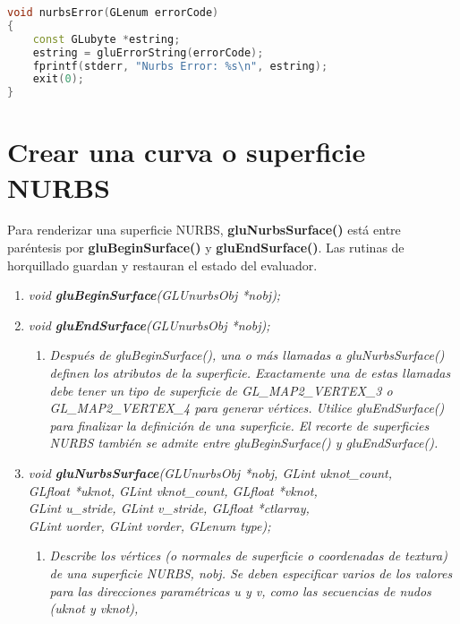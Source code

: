 \begin{lstlisting}[language=C++]
void nurbsError(GLenum errorCode)
{
    const GLubyte *estring;
    estring = gluErrorString(errorCode);
    fprintf(stderr, "Nurbs Error: %s\n", estring);
    exit(0);
}
\end{lstlisting}

\section{Crear una curva o superficie NURBS}

Para renderizar una superficie NURBS, \textbf{gluNurbsSurface()}
está entre paréntesis por \textbf{gluBeginSurface()} y
\textbf{gluEndSurface()}. Las rutinas de horquillado guardan y
restauran el estado del evaluador.

\begin{enumerate}
    \item[] \emph{void \textbf{gluBeginSurface}(GLUnurbsObj *nobj);}
    \item[] \emph{void \textbf{gluEndSurface}(GLUnurbsObj *nobj);}
    \begin{enumerate}
        \item[] \textit{Después de gluBeginSurface(), una o más
            llamadas a gluNurbsSurface() definen los atributos de
            la superficie. Exactamente una de estas llamadas debe
            tener un tipo de superficie de GL\_MAP2\_VERTEX\_3 o
            GL\_MAP2\_VERTEX\_4 para generar vértices. Utilice
            gluEndSurface() para finalizar la definición de una
            superficie. El recorte de superficies NURBS también
            se admite entre gluBeginSurface() y gluEndSurface().
        }
    \end{enumerate}
    \item[] \emph{void \textbf{gluNurbsSurface}(GLUnurbsObj *nobj, GLint uknot\_count,\\
    GLfloat *uknot, GLint vknot\_count, GLfloat *vknot,\\
    GLint u\_stride, GLint v\_stride, GLfloat *ctlarray,\\
    GLint uorder, GLint vorder, GLenum type);}
    \begin{enumerate}
        \item[] \textit{Describe los vértices (o normales de superficie
            o coordenadas de textura) de una superficie NURBS, nobj.
            Se deben especificar varios de los valores para las direcciones
            paramétricas u y v, como las secuencias de nudos (uknot y vknot),
}
\end{enumerate}
\end{enumerate}
